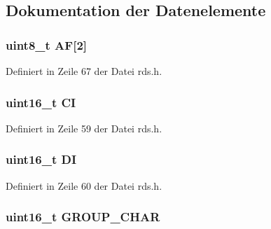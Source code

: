 \subsection{Dokumentation der Datenelemente}
\hypertarget{structgroup__0a_ae5a8515ae995b21e542b2ad52b20c34e}{}
\subsubsection[{A\+F}]{\setlength{\rightskip}{0pt plus 5cm}uint8\+\_\+t A\+F\mbox{[}2\mbox{]}}\label{structgroup__0a_ae5a8515ae995b21e542b2ad52b20c34e}


Definiert in Zeile 67 der Datei rds.\+h.

\hypertarget{structgroup__0a_aa6fd8556e02ce89fed23057f1cb37e44}{}
\subsubsection[{C\+I}]{\setlength{\rightskip}{0pt plus 5cm}uint16\+\_\+t C\+I}\label{structgroup__0a_aa6fd8556e02ce89fed23057f1cb37e44}


Definiert in Zeile 59 der Datei rds.\+h.

\hypertarget{structgroup__0a_ad020d0abff338c9c34924a44478ac591}{}
\subsubsection[{D\+I}]{\setlength{\rightskip}{0pt plus 5cm}uint16\+\_\+t D\+I}\label{structgroup__0a_ad020d0abff338c9c34924a44478ac591}


Definiert in Zeile 60 der Datei rds.\+h.

\hypertarget{structgroup__0a_a66d4119990dc4c3e040a43885e9bb953}{}
\subsubsection[{G\+R\+O\+U\+P\+\_\+\+C\+H\+A\+R}]{\setlength{\rightskip}{0pt plus 5cm}uint16\+\_\+t G\+R\+O\+U\+P\+\_\+\+C\+H\+A\+R}\label{structgroup__0a_a66d4119990dc4c3e040a43885e9bb953}


